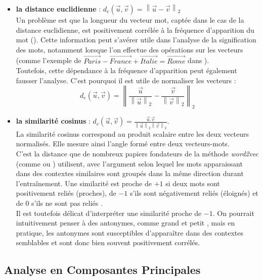 \documentclass[11pt,french,french]{article}
\providecommand{\tightlist}{%
  \setlength{\parskip}{0pt}
  }
\begin{document}
\begin{itemize}
\tightlist
\item
  \textbf{la distance euclidienne} :
  \(d_{e}(\vec{u},\vec{v}) = \left\| \vec{u} - \vec{v} \right\|_2\)\\
  Un problème est que la longueur du vecteur mot, captée dans le cas de
  la distance euclidienne, est positivement corrélée à la fréquence
  d'apparition du mot (\cite{Schakel}). Cette information peut s'avérer
  utile dans l'analyse de la signification des mots, notamment lorsque
  l'on effectue des opérations sur les vecteurs (comme l'exemple de
  \(\overrightarrow{Paris} - \overrightarrow{France} + \overrightarrow{Italie} = \overrightarrow{Rome}\)
  dans \cite{Mikolov}).\\
  Toutefois, cette dépendance à la fréquence d'apparition peut également
  fausser l'analyse. C'est pourquoi il est utile de normaliser les
  vecteurs :
  \[ d_{e}(\vec{u},\vec{v}) = \left\| \frac{\vec{u}}{\left\| \vec{u} \right\|_2} - \frac{\vec{v}}{\left\| \vec{v} \right\|_2}  \right\|_2\]
\item
  \textbf{la similarité cosinus} :
  \(d_{c}(\vec{u}, \vec{v}) = \frac{\vec{u}.\vec{v}}{\left\| \vec{u} \right\|_2 \left\| \vec{v} \right\|_2 }\).\\
  La similarité cosinus correspond au produit scalaire entre les deux
  vecteurs normalisés. Elle mesure ainsi l'angle formé entre deux
  vecteurs-mots.\\
  C'est la distance que de nombreux papiers fondateurs de la méthode
  \emph{word2vec} (comme \cite{Mikolov} ou \cite{Levy}) utilisent, avec
  l'argument selon lequel les mots apparaissant dans des contextes
  similaires sont groupés dans la même direction durant l'entraînement.
  Une similarité est proche de \(+1\) si deux mots sont positivement
  reliés (proches), de \(-1\) s'ils sont négativement reliés (éloignés)
  et de 0 s'ils ne sont pas \og reliés \fg{}.\\
  Il est toutefois délicat d'interpréter une similarité proche de
  \(-1\). On pourrait intuitivement penser à des antonymes, comme
  \og grand \fg{} et \og petit \fg{}, mais en pratique, les antonymes
  sont susceptibles d'apparaître dans des contextes semblables et sont
  donc bien souvent positivement corrélés.
\end{itemize}

\subsection{Analyse en Composantes
Principales}\label{analyse-en-composantes-principales}
\end{document}
